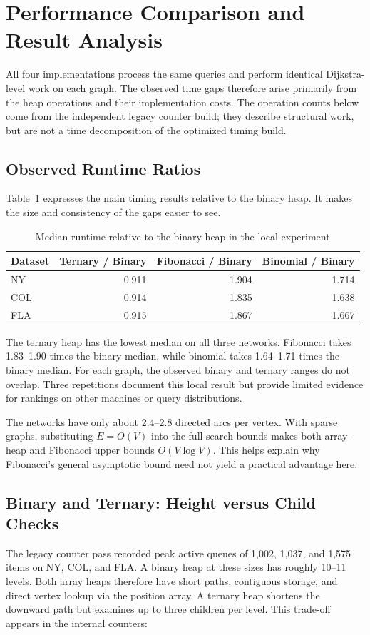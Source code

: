 \documentclass[12pt,a4paper]{report}
\begin{document}
\section{Performance Comparison and Result Analysis}
All four implementations process the same queries and perform identical
Dijkstra-level work on each graph. The observed time gaps therefore arise
primarily from the heap operations and their implementation costs. The
operation counts below come from the independent legacy counter build; they
describe structural work, but are not a time decomposition of the optimized
timing build.

\subsection{Observed Runtime Ratios}
Table~\ref{tab:runtime-ratios} expresses the main timing results relative to
the binary heap. It makes the size and consistency of the gaps easier to see.

\begin{table}[H]
  \centering
  \small
  \caption{Median runtime relative to the binary heap in the local experiment}
  \label{tab:runtime-ratios}
  \begin{tabular}{lrrr}
    \toprule
    Dataset & Ternary / Binary & Fibonacci / Binary & Binomial / Binary \\
    \midrule
    NY & 0.911 & 1.904 & 1.714 \\
    COL & 0.914 & 1.835 & 1.638 \\
    FLA & 0.915 & 1.867 & 1.667 \\
    \bottomrule
  \end{tabular}
\end{table}


The ternary heap has the lowest median on all three networks. Fibonacci
takes 1.83--1.90 times the binary median,
while binomial takes 1.64--1.71 times the binary median.
For each graph, the observed binary and ternary ranges do not overlap.
Three repetitions document this local result but provide limited evidence
for rankings on other machines or query distributions.

The networks have only about 2.4--2.8 directed arcs per vertex.
With sparse graphs, substituting $E=O(V)$ into the full-search bounds makes
both array-heap and Fibonacci upper bounds $O(V\log V)$. This helps explain why
Fibonacci's general asymptotic bound need not yield a practical advantage here.

\subsection{Binary and Ternary: Height versus Child Checks}
The legacy counter pass recorded peak active queues of 1,002, 1,037, and 1,575 items on NY, COL, and
FLA. A binary heap at these sizes has roughly 10--11 levels. Both array heaps
therefore have short paths, contiguous storage, and direct vertex lookup via
the position array. A ternary heap shortens the downward path but examines up
to three children per level. This trade-off appears in the internal counters:
\end{document}

